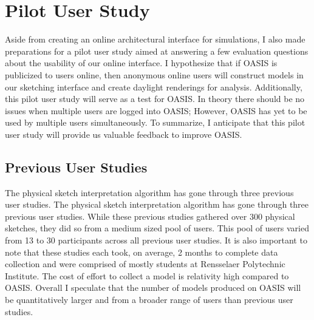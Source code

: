 \chapter{Pilot User Study} \label{sec:userstudy}
Aside from creating an online architectural interface for simulations, I also made preparations for a pilot user study aimed at answering a few evaluation questions about the usability of our online interface.
I hypothesize that if OASIS is publicized to users online, then anonymous online users will construct models in our sketching interface and create daylight renderings for analysis.
Additionally, this pilot user study will serve as a test for OASIS.
In theory there should be no issues when multiple users are logged into OASIS;
However, OASIS has yet to be used by multiple users simultaneously.
To summarize, I anticipate  that this pilot user study will provide us valuable feedback to improve OASIS.
\\

\section{Previous User Studies}
	The physical sketch interpretation algorithm has gone through three previous user studies.
	The physical sketch interpretation algorithm has gone through three previous user studies.
	While these previous studies gathered over 300 physical sketches, they did so from a medium sized pool of users.
	This pool of users varied from 13 to 30 participants across all previous user studies.
	It is also important to note that these studies each took, on average, 2 months to complete data collection and were comprised of mostly students at Rensselaer Polytechnic Institute.
	The cost of effort to collect a model is relativity high compared to OASIS.
	Overall I speculate that the number of models produced on OASIS will be quantitatively larger  and from a broader range of users than previous user studies.

